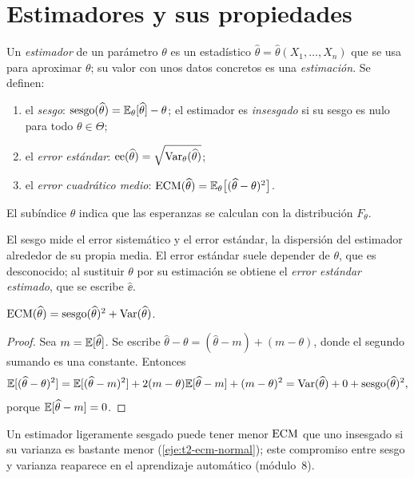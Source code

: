 \section{Estimadores y sus propiedades}

\begin{definicion}\label{def:t2-estimador}
Un \emph{estimador} de un parámetro $\theta$ es un estadístico $\widehat\theta=\widehat\theta(X_1,\dots,X_n)$ que se usa para aproximar $\theta$; su valor con unos datos concretos es una \emph{estimación}. Se definen:
\begin{enumerate}
  \item el \emph{sesgo}: $\operatorname{sesgo}(\widehat\theta)=\mathbb{E}_\theta[\widehat\theta]-\theta$; el estimador es \emph{insesgado} si su sesgo es nulo para todo $\theta\in\Theta$;
  \item el \emph{error estándar}: $\operatorname{ee}(\widehat\theta)=\sqrt{\operatorname{Var}_\theta(\widehat\theta)}$;
  \item el \emph{error cuadrático medio}: $\operatorname{ECM}(\widehat\theta)=\mathbb{E}_\theta\bigl[(\widehat\theta-\theta)^{2}\bigr]$.
\end{enumerate}
El subíndice $\theta$ indica que las esperanzas se calculan con la distribución $F_\theta$.
\end{definicion}

El sesgo mide el error sistemático y el error estándar, la dispersión del estimador alrededor de su propia media. El error estándar suele depender de $\theta$, que es desconocido; al sustituir $\theta$ por su estimación se obtiene el \emph{error estándar estimado}, que se escribe $\widehat{\ee}$.

\begin{proposicion}\label{prop:t2-ecm}
$\operatorname{ECM}(\widehat\theta)=\operatorname{sesgo}(\widehat\theta)^{2}+\operatorname{Var}(\widehat\theta)$.
\end{proposicion}

\begin{proof}
Sea $m=\mathbb{E}[\widehat\theta]$. Se escribe $\widehat\theta-\theta=(\widehat\theta-m)+(m-\theta)$, donde el segundo sumando es una constante. Entonces
\[
\mathbb{E}[(\widehat\theta-\theta)^{2}]=\mathbb{E}[(\widehat\theta-m)^{2}]+2(m-\theta)\mathbb{E}[\widehat\theta-m]+(m-\theta)^{2}=\operatorname{Var}(\widehat\theta)+0+\operatorname{sesgo}(\widehat\theta)^{2},
\]
porque $\mathbb{E}[\widehat\theta-m]=0$.
\end{proof}

Un estimador ligeramente sesgado puede tener menor $\operatorname{ECM}$ que uno insesgado si su varianza es bastante menor (\cref{eje:t2-ecm-normal}); este compromiso entre sesgo y varianza reaparece en el aprendizaje automático (módulo~8).

